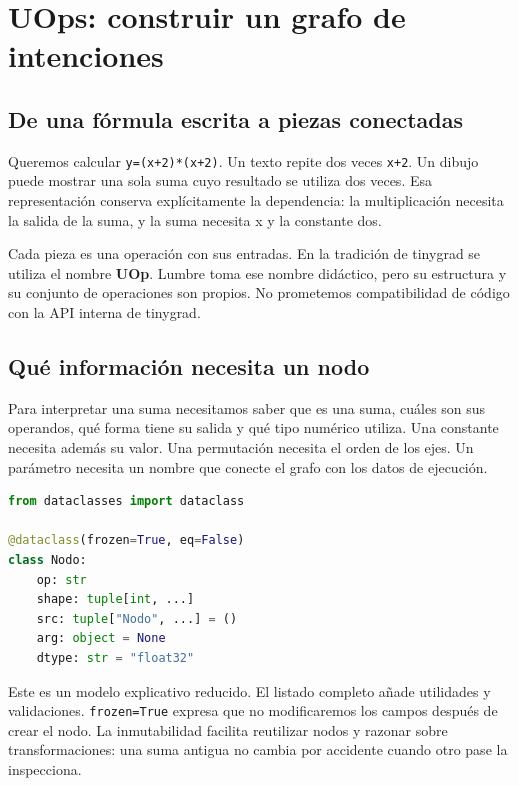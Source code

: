 \documentclass[12pt,a4paper,oneside]{report}
\begin{document}
\chapter{UOps: construir un grafo de intenciones}
\label{ch:uops}
\section{De una fórmula escrita a piezas conectadas}
Queremos calcular \texttt{y=(x+2)*(x+2)}. Un texto repite dos veces \texttt{x+2}. Un dibujo puede mostrar una sola suma cuyo resultado se utiliza dos veces. Esa representación conserva explícitamente la dependencia: la multiplicación necesita la salida de la suma, y la suma necesita x y la constante dos.

\begin{center}
\end{center}
Cada pieza es una operación con sus entradas. En la tradición de tinygrad se utiliza el nombre \textbf{UOp}. Lumbre toma ese nombre didáctico, pero su estructura y su conjunto de operaciones son propios. No prometemos compatibilidad de código con la API interna de tinygrad. \cite{tinygrad-dev}

\section{Qué información necesita un nodo}
Para interpretar una suma necesitamos saber que es una suma, cuáles son sus operandos, qué forma tiene su salida y qué tipo numérico utiliza. Una constante necesita además su valor. Una permutación necesita el orden de los ejes. Un parámetro necesita un nombre que conecte el grafo con los datos de ejecución.

\begin{lstlisting}[language=Python]
from dataclasses import dataclass

@dataclass(frozen=True, eq=False)
class Nodo:
    op: str
    shape: tuple[int, ...]
    src: tuple["Nodo", ...] = ()
    arg: object = None
    dtype: str = "float32"
\end{lstlisting}
Este es un modelo explicativo reducido. El listado completo añade utilidades y validaciones. \texttt{frozen=True} expresa que no modificaremos los campos después de crear el nodo. La inmutabilidad facilita reutilizar nodos y razonar sobre transformaciones: una suma antigua no cambia por accidente cuando otro pase la inspecciona.
\end{document}
